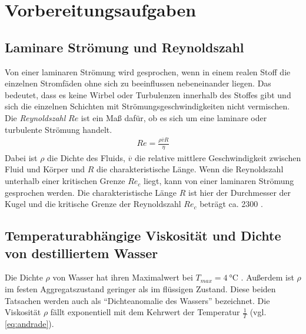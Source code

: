 \section{Vorbereitungsaufgaben}
\subsection{Laminare Strömung und Reynoldszahl}
\label{sec:vorbereitung}
Von einer laminaren Strömung wird gesprochen, wenn in einem realen Stoff
die einzelnen Stromfäden ohne sich zu beeinflussen nebeneinander liegen. Das bedeutet, dass es keine Wirbel oder
Turbulenzen innerhalb des Stoffes gibt und sich die einzelnen Schichten mit Strömungsgeschwindigkeiten nicht vermischen.
Die \textit{Reynoldszahl} $Re$ ist ein Maß dafür, ob es sich um eine laminare oder turbulente Strömung handelt.
\noindent
\begin{align}
    Re = \frac{\rho \overline{v} R}{\eta}
\end{align}
Dabei ist $\rho$ die Dichte des Fluids, $\overline{v}$ die relative mittlere Geschwindigkeit zwischen Fluid und Körper und
$R$ die charakteristische Länge.
Wenn die Reynoldszahl unterhalb einer kritischen Grenze $Re_c$ liegt, kann von einer laminaren Strömung gesprochen werden.
Die charakteristische Länge $R$ ist hier der Durchmesser der Kugel und die kritische Grenze der Reynoldszahl $Re_c$ beträgt ca. 2300 \cite*[]{geschke}.


\subsection{Temperaturabhängige Viskosität und Dichte von destilliertem Wasser}
Die Dichte $\rho$ von Wasser hat ihren Maximalwert bei $T_{max} = \qty[]{4}{\degreeCelsius}$ \cite*[]{geschke}.
Außerdem ist $\rho$ im festen Aggregatszustand geringer als im flüssigen Zustand. 
Diese beiden Tatsachen werden auch als \enquote{Dichteanomalie des Wassers} bezeichnet\cite*[]{demtroeder}.
Die Viskosität $\rho$ fällt exponentiell mit dem Kehrwert der Temperatur $\frac{1}{T}$ (vgl. \eqref{eq:andrade}).

